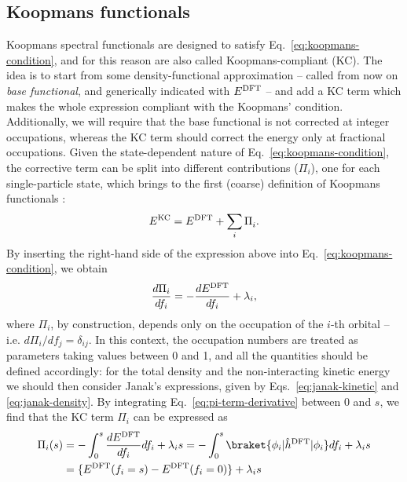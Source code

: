 
\subsection{Koopmans functionals\label{sec:koopmans-functionals}}
Koopmans spectral functionals are designed to satisfy Eq.~\eqref{eq:koopmans-condition}, and for this reason are also called Koopmans-compliant (KC). The idea is to start from some density-functional approximation -- called from now on \emph{base functional}, and generically indicated with $E^{\rm DFT}$ -- and add a KC term which makes the whole expression compliant with the Koopmans' condition. Additionally, we will require that the base functional is not corrected at integer occupations, whereas the KC term should correct the energy only at fractional occupations. Given the state-dependent nature of Eq.~\eqref{eq:koopmans-condition}, the corrective term can be split into different contributions ($\Pi_i$), one for each single-particle state, which brings to the first (coarse) definition of Koopmans functionals  \cite{dabo_non-koopmans_2009,dabo_koopmans_2010}:
%
\begin{equation}
    E^{\rm KC} = E^{\rm DFT} + \sum_i \Pi_i^{\rm} .
    \label{eq:kc-functional-coarse}
\end{equation}
%
By inserting the right-hand side of the expression above into Eq.~\eqref{eq:koopmans-condition}, we obtain
%
\begin{equation}
    \frac{d\Pi_i}{df_i} = - \frac{dE^{\rm DFT}}{df_i} + \lambda_i ,
    \label{eq:pi-term-derivative}
\end{equation}
%
where $\Pi_i$, by construction, depends only on the occupation of the $i$-th orbital -- i.e. $d\Pi_i / df_j = \delta_{ij}$. In this context, the occupation numbers are treated as parameters taking values between 0 and 1, and all the quantities should be defined accordingly: for the total density and the non-interacting kinetic energy we should then consider Janak's expressions, given by Eqs.~\eqref{eq:janak-kinetic} and \eqref{eq:janak-density}. By integrating Eq.~\eqref{eq:pi-term-derivative} between 0 and $s$, we find that the KC term $\Pi_i$ can be expressed as
%
\begin{equation}
    \begin{split}
    \Pi_i(s) &= - \int_0^{s} \frac{dE^{\rm DFT}}{df_i} df_i + \lambda_i s =
    - \int_0^{s} \braket{\phi_i|\hat{h}^{\rm DFT}|\phi_i} df_i + \lambda_i s \\
    &= \{ E^{\rm DFT}(f_i=s) - E^{\rm DFT}(f_i=0) \} + \lambda_i s
    \end{split}
    \label{eq:pi-term-general}
\end{equation}
